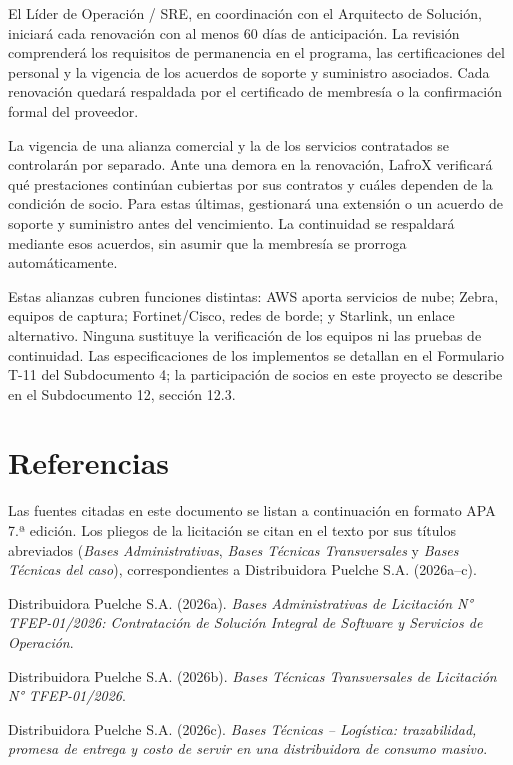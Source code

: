 El Líder de Operación / SRE, en coordinación con el Arquitecto de Solución, iniciará cada renovación con al menos 60 días de anticipación. La revisión comprenderá los requisitos de permanencia en el programa, las certificaciones del personal y la vigencia de los acuerdos de soporte y suministro asociados. Cada renovación quedará respaldada por el certificado de membresía o la confirmación formal del proveedor.

La vigencia de una alianza comercial y la de los servicios contratados se controlarán por separado. Ante una demora en la renovación, LafroX verificará qué prestaciones continúan cubiertas por sus contratos y cuáles dependen de la condición de socio. Para estas últimas, gestionará una extensión o un acuerdo de soporte y suministro antes del vencimiento. La continuidad se respaldará mediante esos acuerdos, sin asumir que la membresía se prorroga automáticamente.

Estas alianzas cubren funciones distintas: AWS aporta servicios de nube; Zebra, equipos de captura; Fortinet/Cisco, redes de borde; y Starlink, un enlace alternativo. Ninguna sustituye la verificación de los equipos ni las pruebas de continuidad. Las especificaciones de los implementos se detallan en el Formulario T-11 del Subdocumento 4; la participación de socios en este proyecto se describe en el Subdocumento 12, sección 12.3.
\section*{Referencias}

Las fuentes citadas en este documento se listan a continuación en formato APA 7.ª edición. Los pliegos de la licitación se citan en el texto por sus títulos abreviados (\textit{Bases Administrativas}, \textit{Bases Técnicas Transversales} y \textit{Bases Técnicas del caso}), correspondientes a Distribuidora Puelche S.A. (2026a--c).

{\setlength{\parindent}{0pt}
\hangindent=1.27cm Distribuidora Puelche S.A. (2026a). \textit{Bases Administrativas de Licitación N° TFEP-01/2026: Contratación de Solución Integral de Software y Servicios de Operación}.\par\medskip
\hangindent=1.27cm Distribuidora Puelche S.A. (2026b). \textit{Bases Técnicas Transversales de Licitación N° TFEP-01/2026}.\par\medskip
\hangindent=1.27cm Distribuidora Puelche S.A. (2026c). \textit{Bases Técnicas -- Logística: trazabilidad, promesa de entrega y costo de servir en una distribuidora de consumo masivo}.\par\medskip

}

